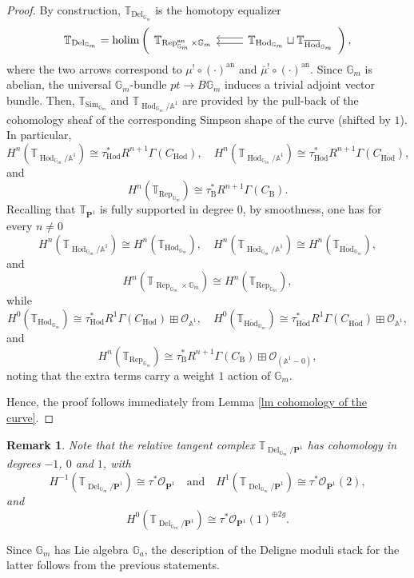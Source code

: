 \documentclass[11pt, a4paper]{amsart}
\numberwithin{equation}{section}
\newtheorem{remark}[theorem]{Remark}
\theoremstyle{definition}
\theoremstyle{remark}
\DeclareMathOperator{\an}{an}
\DeclareMathOperator{\Rep}{Rep}
\DeclareMathOperator{\Deligne}{Del}
\DeclareMathOperator{\Hod}{Hod}
\DeclareMathOperator{\Sim}{Sim}
\DeclareMathOperator{\Del}{Del}
\newcommand{\Oo}{\mathcal{O}}
\newcommand{\B}{\mathrm{B}}
\renewcommand{\P}{\mathbf{P}}
\newcommand{\ol}[1]{\overline{#1}}
\renewcommand{\AA}{\mathbb{A}}
\newcommand{\GG}{\mathbb{G}}
\newcommand{\TT}{\mathbb{T}}
\renewcommand{\to}{\longrightarrow}
\begin{document}
\begin{proof}
By construction, $\TT_{\Deligne_{\GG_m}}$ is the homotopy equalizer
\[
\TT_{\Deligne_{\GG_m}} = \mathrm{holim} \left ( \begin{tikzcd}
	\TT_{\Rep^{\an}_{\GG_m} \times \GG_m}   &  \TT_{\Hod_{\GG_m}} \sqcup \TT_{\ol \Hod_{\GG_m}}
	\arrow[shift right, from=1-2, to=1-1]
	\arrow[shift left, from=1-2, to=1-1]
\end{tikzcd} \right ) ,
\]
where the two arrows correspond to $\mu^! \circ (\cdot)^{\an}$ and $\ol\mu^! \circ (\cdot)^{\an}$. Since $\GG_m$ is abelian, the universal $\GG_m$-bundle $pt \to B\GG_m$ induces a trivial adjoint vector bundle. Then, $\TT_{\Sim_{\GG_m}}$ and $\TT_{\Hod_{\GG_m}/\AA^1}$ are provided by the pull-back of the cohomology sheaf of the corresponding Simpson shape of the curve (shifted by $1$). In particular, 
\[
H^n(\TT_{\Hod_{\GG_m}/\AA^1}) \cong \tau_{\Hod}^* R^{n+1}\Gamma(C_{\Hod}), \quad H^n(\TT_{\ol\Hod_{\GG_m}/\AA^1}) \cong \tau_{\ol \Hod}^* R^{n+1}\Gamma(C_{\ol \Hod}),
\]
and
\[
H^n(\TT_{\Rep_{\GG_m}}) \cong \tau_{\B}^* R^{n+1}\Gamma(C_{\B}).
\]
Recalling that $\TT_{\P^1}$ is fully supported in degree $0$, by smoothness, one has for every $n \neq 0$
\[
H^n(\TT_{\Hod_{\GG_m}/\AA^1}) \cong H^n(\TT_{\Hod_{\GG_m}}), \quad H^n(\TT_{\ol\Hod_{\GG_m}/\AA^1}) \cong H^n(\TT_{\ol\Hod_{\GG_m}}), 
\] 
and 
\[
H^n(\TT_{\Rep_{\GG_m} \times \GG_m}) \cong H^n(\TT_{\Rep_{\GG_m}}),
\]
while
\[
H^0(\TT_{\Hod_{\GG_m}}) \cong \tau_{\Hod}^* R^{1}\Gamma(C_{\Hod}) \boxplus \Oo_{\AA^1}, \quad H^0(\TT_{\ol\Hod_{\GG_m}}) \cong \tau_{\ol \Hod}^* R^{1}\Gamma(C_{\ol \Hod}) \boxplus \Oo_{\AA^1},
\]
and
\[
H^n(\TT_{\Rep_{\GG_m}}) \cong \tau_{\B}^* R^{n+1}\Gamma(C_{\B}) \boxplus \Oo_{(\AA^1- 0)},
\]
noting that the extra terms carry a weight $1$ action of $\GG_m$.

Hence, the proof follows immediately from Lemma \ref{lm cohomology of the curve}.
\end{proof}

\begin{remark} \label{rm Dirac for ad}
Note that the relative tangent complex $\TT_{\Del_{\GG_m}/ \P^1}$ has cohomology in degrees $-1$, $0$ and $1$, with
\[
H^{-1}(\TT_{\Deligne_{\GG_m}/ \P^1}) \cong \tau^*\Oo_{\P^1} \quad \text{and} \quad H^{1}(\TT_{\Deligne_{\GG_m}/ \P^1}) \cong \tau^*\Oo_{\P^1}(2),
\]
and
\[
H^{0}(\TT_{\Deligne_{\GG_m}/ \P^1}) \cong \tau^*\Oo_{\P^1}(1)^{\oplus 2g}.
\]
\end{remark}


Since $\GG_m$ has Lie algebra $\GG_a$, the description of the Deligne moduli stack for the latter follows from the previous statements.
\end{document}
